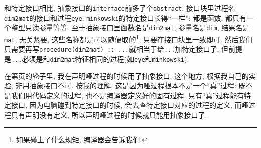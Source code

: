 和特定接口相比, 抽象接口的\texttt{interface}前多了个\texttt{abstract}. 接口块里过程名\texttt{dim2mat}的接口和过程\texttt{eye}, \texttt{minkowski}的特定接口长得``一样'': 都是函数, 都只有一个整型只读参量等等. 至于抽象接口里函数名是\texttt{dim2mat}, 参量名是\texttt{dim}, 结果名是\texttt{mat}, 无关紧要, 这些名称都是可以随便取的\footnote{如果碰上了什么规矩, 编译器会告诉我们.}, 只要在接口块里一致即可. 然后我们只需要再写\texttt{procedure(dim2mat) :: ...}就相当于给\texttt{...}加特定接口了, 但前提是\texttt{...}必须是和\texttt{dim2mat}特征相同的过程(如\texttt{eye}和\texttt{minkowski}).

在第\pageref{dummy_procedure_program}页的轮子里, 我在声明哑过程的时候用了抽象接口, 这个地方, 根据我自己的实验, 非用抽象接口不可. 按我的理解, 这是因为哑过程根本不是一个``真''过程: 既不是我们用代码定义的过程, 也不是编译器定义好的固有过程. 只有``真''过程能有特定接口, 因为电脑碰到特定接口的时候, 会去查特定接口对应的过程的定义, 而哑过程只有声明没有定义, 所以声明哑过程的时候就只能用抽象接口了.
